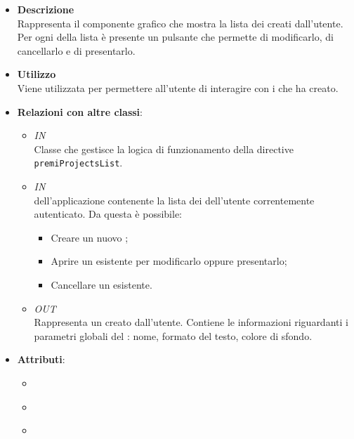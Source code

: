 \begin{itemize}
\item \textbf{Descrizione}\\
Rappresenta il componente grafico che mostra la lista dei  creati dall’utente. Per ogni  della lista è presente un pulsante che permette di modificarlo, di cancellarlo e di presentarlo.
\item \textbf{Utilizzo}\\
Viene utilizzata per permettere all’utente di interagire con i  che ha creato.
\item \textbf{Relazioni con altre classi}:
\begin{itemize}
\item \textit{IN} \hyperref[\nogloxy{Premi::Front-End::Controllers::ProjectsListController}]{}\\
Classe che gestisce la logica di funzionamento della directive \texttt{premiProjectsList}.
\item \textit{IN} \hyperref[\nogloxy{Premi::Front-End::Views::DashboardView}]{}\\
 dell’applicazione contenente la lista dei  dell’utente correntemente autenticato.
Da questa  è possibile:
\begin{itemize}
\item Creare un nuovo ;
\item Aprire un  esistente per modificarlo oppure presentarlo;
\item Cancellare un  esistente.
\end{itemize}
\item \textit{OUT} \hyperref[\nogloxy{Premi::Front-End::Model::Project}]{}\\
Rappresenta un  creato dall’utente. Contiene le informazioni riguardanti i parametri globali del : nome, formato del testo, colore di sfondo.
\end{itemize}
\item \textbf{Attributi}:
\begin{itemize}
\item {}
\\ \dpDirectiveController
\item {}
\\ \dpReplace
\item {}

\end{itemize}
\end{itemize}
